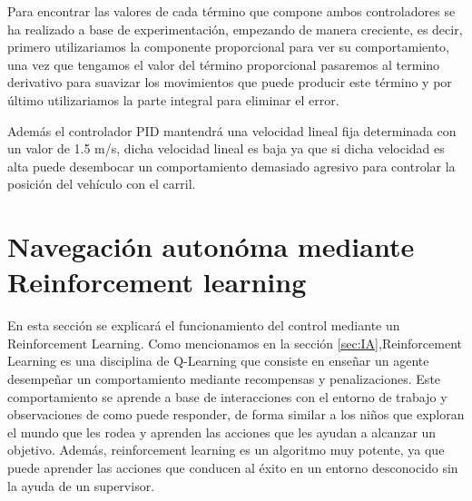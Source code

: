   Para encontrar las valores de cada término que compone ambos controladores se ha realizado a base de experimentación, empezando de manera creciente, es decir, primero utilizariamos
  la componente proporcional para ver su comportamiento, una vez que tengamos el valor del término proporcional pasaremos al termino derivativo para suavizar los movimientos que puede
  producir este término y por último utilizariamos la parte integral para eliminar el error. 

  Además el controlador PID mantendrá una velocidad lineal fija determinada con un valor de 1.5 m/s, dicha velocidad lineal es baja ya que si dicha velocidad es alta puede desembocar
  un comportamiento demasiado agresivo para controlar la posición del vehículo con el carril.

  \section{Navegación autonóma mediante Reinforcement learning}
  \label{sec:Reinforcement learning}
  En esta sección se explicará el funcionamiento del control mediante un Reinforcement Learning. \newline
  Como mencionamos en la sección \ref{sec:IA},Reinforcement Learning es una disciplina de Q-Learning que consiste en enseñar un agente 
  desempeñar un comportamiento mediante recompensas y penalizaciones. Este comportamiento se aprende a base de interacciones con el entorno de trabajo y observaciones de como puede responder,
  de forma similar a los niños que exploran el mundo que les rodea y aprenden las acciones que les ayudan a alcanzar un objetivo. Además, reinforcement learning es un algoritmo muy potente, 
  ya que puede aprender las acciones que conducen al éxito en un entorno desconocido sin la ayuda de un supervisor. \newline

